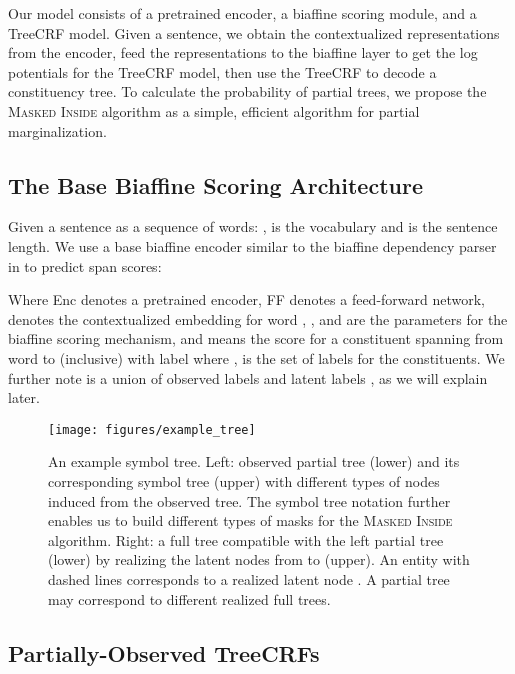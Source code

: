 	


Our model consists of a pretrained encoder, a biaffine scoring module, and a TreeCRF model. 
Given a sentence, we obtain the contextualized representations from the encoder, feed the representations to the biaffine layer to get the log potentials for the TreeCRF model, then use the TreeCRF to decode a constituency tree. 
To calculate the probability of partial trees, we propose the \textsc{Masked Inside} algorithm as a simple, efficient algorithm for partial marginalization. 


\subsection{The Base Biaffine Scoring Architecture}
\label{ssec:base_biaffine}
Given a sentence  as a sequence of words: ,  is the vocabulary and  is the  sentence length. 
We use a base biaffine encoder similar to the biaffine dependency parser in \citet{Dozat2017DeepBA} to predict span scores: 

 
Where Enc denotes a pretrained encoder, FF denotes a feed-forward network,  denotes the contextualized embedding for word , ,  and  are the parameters for the biaffine scoring mechanism, and  means the score for a constituent spanning from word  to  (inclusive) with label  where
,  is the set of labels for the constituents. 
We further note  is a union of observed labels  and latent labels , as we will explain later.

\begin{figure}
  \begin{center}		
    \texttt{[image: figures/example\_tree]}
  \end{center}	
  \caption{\label{fig:example_tree} An example symbol tree.
  Left: observed partial tree (lower) and its corresponding symbol tree (upper) with different types of nodes induced from the observed tree.
  The symbol tree notation further enables us to build different types of masks for the \textsc{Masked Inside} algorithm. 
  Right: a full tree compatible with the left partial tree (lower) by realizing the latent nodes from \scalebox{0.8}{} to \scalebox{0.8}{} (upper). 
  An entity with dashed lines corresponds to a realized latent node \scalebox{0.8}{}. 
  A partial tree may correspond to different realized full trees. 
  }
\end{figure} 

\subsection{Partially-Observed TreeCRFs}
\label{ssec:po_treecrfs}

